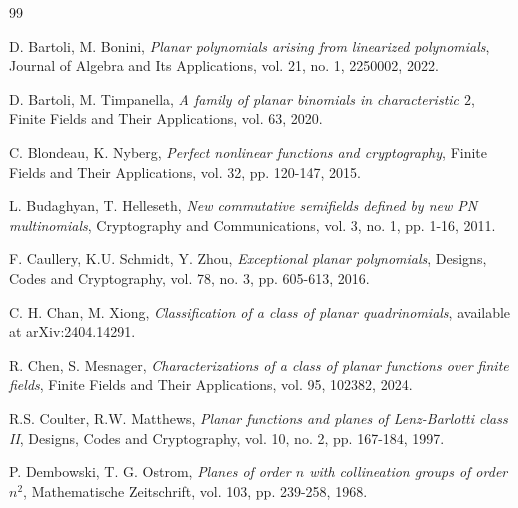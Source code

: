 \documentclass[12pt]{amsart}
\begin{document}
	\begin{thebibliography}{99}

 D. Bartoli, M. Bonini, \textit{Planar polynomials arising from linearized polynomials}, Journal of Algebra and Its Applications, vol. 21, no. 1, 2250002, 2022.

 D. Bartoli, M. Timpanella, \textit{A family of planar binomials in characteristic $2$}, Finite Fields and Their Applications, vol. 63, 2020.


 C. Blondeau, K. Nyberg, \textit{Perfect nonlinear functions and cryptography}, Finite Fields and Their Applications, vol. 32, pp. 120-147, 2015.

 L. Budaghyan, T. Helleseth, \textit{New commutative semifields defined by new PN multinomials}, Cryptography and Communications, vol. 3, no. 1, pp. 1-16, 2011.

 F. Caullery, K.U. Schmidt, Y. Zhou, \textit{Exceptional planar polynomials}, Designs, Codes and Cryptography, vol. 78, no. 3, pp. 605-613, 2016.


 C. H. Chan, M. Xiong, \textit{Classification of a class of planar quadrinomials}, available at arXiv:2404.14291.

 R. Chen, S. Mesnager, \textit{Characterizations of a class of planar functions over finite fields}, Finite Fields and Their Applications, vol. 95, 102382, 2024.

 R.S. Coulter, R.W. Matthews, \textit{Planar functions and planes of Lenz-Barlotti class II}, Designs, Codes and Cryptography, vol. 10, no. 2, pp. 167-184, 1997.

 P. Dembowski, T. G. Ostrom, \textit{Planes of order $n$ with collineation groups of order $n^2$}, Mathematische Zeitschrift, vol. 103, pp. 239-258, 1968.



\end{thebibliography}
\end{document}

